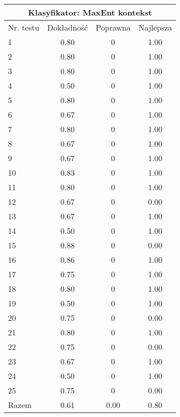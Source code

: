 \documentclass[notitlepage,leqno,fleqn,a4paper]{article}
\begin{document}
\begin{tabular}{|l|c|c|c|}
\hline
\multicolumn{4}{|c|}{Klasyfikator: MaxEnt kontekst}\\
\hline
Nr. testu & Dokładność & Poprawna & Najlepsza\\
\hline
1 & 0.80 & 0 & 1.00 \\
2 & 0.80 & 0 & 1.00 \\
3 & 0.80 & 0 & 1.00 \\
4 & 0.50 & 0 & 1.00 \\
5 & 0.80 & 0 & 1.00 \\
6 & 0.67 & 0 & 1.00 \\
7 & 0.80 & 0 & 1.00 \\
8 & 0.67 & 0 & 1.00 \\
9 & 0.67 & 0 & 1.00 \\
10 & 0.83 & 0 & 1.00 \\
11 & 0.80 & 0 & 1.00 \\
12 & 0.67 & 0 & 0.00 \\
13 & 0.67 & 0 & 1.00 \\
14 & 0.50 & 0 & 1.00 \\
15 & 0.88 & 0 & 0.00 \\
16 & 0.86 & 0 & 1.00 \\
17 & 0.75 & 0 & 1.00 \\
18 & 0.80 & 0 & 1.00 \\
19 & 0.50 & 0 & 1.00 \\
20 & 0.75 & 0 & 0.00 \\
21 & 0.80 & 0 & 1.00 \\
22 & 0.75 & 0 & 0.00 \\
23 & 0.67 & 0 & 1.00 \\
24 & 0.50 & 0 & 1.00 \\
25 & 0.75 & 0 & 0.00 \\
\hline
Razem & 0.61 & 0.00 & 0.80 \\
\hline
\end{tabular}
\end{document}
